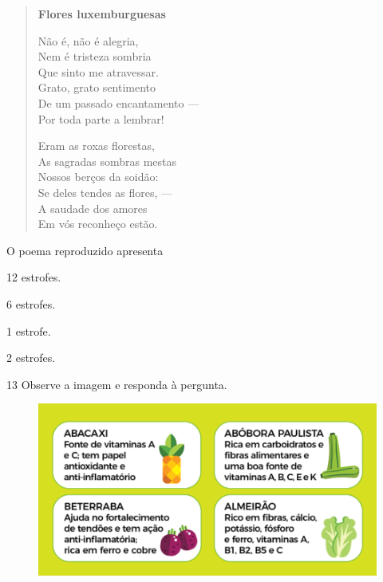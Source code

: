 \enlargethispage{4\baselineskip}
\begin{myquote}
\begin{verse}
\textbf{Flores luxemburguesas}

Não é, não é alegria,\\
Nem é tristeza sombria\\
Que sinto me atravessar.\\
Grato, grato sentimento\\
De um passado encantamento ---\\
Por toda parte a lembrar!

Eram as roxas florestas,\\
As sagradas sombras mestas\\
Nossos berços da soidão:\\
Se deles tendes as flores, ---\\
A saudade dos amores\\
Em vós reconheço estão.
\end{verse}

\end{myquote}

O poema reproduzido apresenta

\begin{escolha}
  \item 12 estrofes.

  \item 6 estrofes.

  \item 1 estrofe.

  \item 2 estrofes.
\end{escolha}


\num{13} Observe a imagem e responda à pergunta.

\begin{figure}[htpb!]
\includegraphics[width=\textwidth]{./imgQ4PORT/media/image4.png}
\end{figure}

